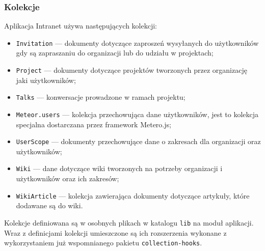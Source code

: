   \subsubsection{Kolekcje}
Aplikacja Intranet używa następujących kolekcji:
\begin{itemize}
 \item \verb|Invitation| --- dokumenty dotyczące zaproszeń wysyłanych do użytkowników gdy są zapraszaniu do organizacji lub do udziału w projektach;
 \item \verb|Project| --- dokumenty dotyczące projektów tworzonych przez organizację jaki użytkowników;
 \item \verb|Talks| --- konwersacje prowadzone w ramach projektu;
 \item \verb|Meteor.users| --- kolekcja przechowująca dane użytkowników, jest to kolekcja specjalna dostarczana przez framework Metero.js;
 \item \verb|UserScope| --- dokumenty przechowujące dane o zakresach dla organizacji oraz użytkowników;
 \item \verb|Wiki| --- dane dotyczące wiki tworzonych na potrzeby organizacji i użytkowników oraz ich zakresów;
 \item \verb|WikiArticle| --- kolekcja zawierająca dokumenty dotyczące artykuły, które dodawane są do wiki.
\end{itemize}
Kolekcje definiowana są w osobnych plikach w katalogu \verb|lib| na moduł aplikacji. Wraz z definicjami kolekcji umieszczone są ich rozszerzenia wykonane z wykorzystaniem już wspomnianego pakietu \verb|collection-hooks|.

